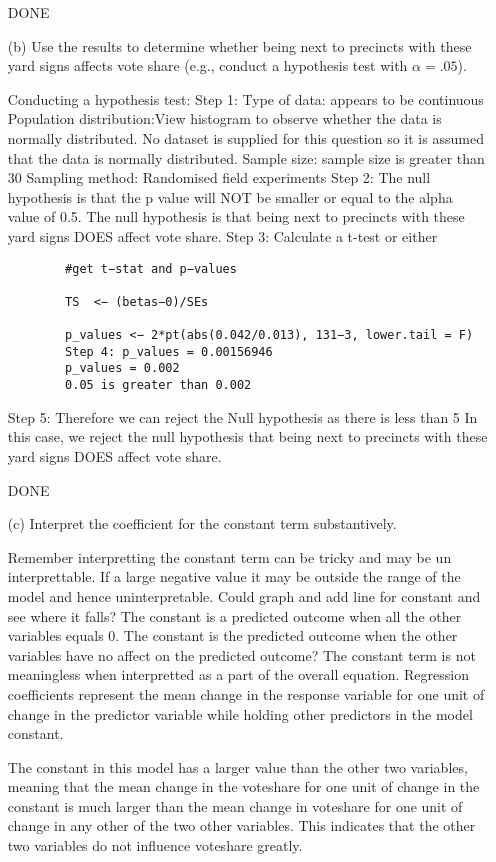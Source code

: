 \documentclass[12pt,letterpaper]{article}
\begin{document}
\begin{enumerate}
DONE
		\newpage		
		\item [(b)]  Use the results to determine whether being
		next to precincts with these yard signs affects vote
		share (e.g., conduct a hypothesis test with $\alpha = .05$).
		
		Conducting a hypothesis test:
			Step 1: Type of data: appears to be continuous
		Population distribution:View histogram to observe whether the data is normally distributed. No dataset is supplied for this question so it is assumed that the data is normally distributed.
		Sample size: sample size is greater than 30 
		Sampling method: Randomised field experiments
		Step 2: The null hypothesis is that the p value will NOT be smaller or equal to the alpha value of 0.5. The null hypothesis is that being next to precincts with these yard signs DOES affect vote share. 
		Step 3: Calculate a t-test  or either 
	\begin{verbatim}
		#get t−stat and p−values
		
		TS	<− (betas−0)/SEs
		
		p_values <− 2*pt(abs(0.042/0.013), 131−3, lower.tail = F)
		Step 4: p_values = 0.00156946
		p_values = 0.002
		0.05 is greater than 0.002
		\end{verbatim}
		Step 5: Therefore we can reject the Null hypothesis 
		as there is less than 5%
		In this case, we reject the null hypothesis that
		  being next to precincts with these yard signs DOES affect vote share.
		
	DONE
	
		\item [(c)] Interpret the coefficient for the constant term substantively.
		
		Remember interpretting the constant term can be tricky and may be un interprettable. If a large negative value it may be outside the range of the model and hence uninterpretable.
		Could graph and add line for constant and see where it falls?
		The constant is a predicted outcome when all the other variables equals 0. The constant is the predicted outcome when the other variables have no affect on the predicted outcome? The constant term is not meaningless when interpretted as a part of the overall equation.  Regression coefficients represent the mean change in the response variable for one unit of change in the predictor variable while holding other predictors in the model constant.
		
		The constant in this model has a larger value than the other two variables, meaning that the mean change in the voteshare for one unit of change in the constant is much larger than the mean change in voteshare for one unit of change in any other of the two other variables. This indicates that the other two variables do not influence voteshare greatly.
		

\end{enumerate}
\end{document}
